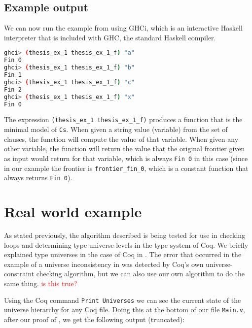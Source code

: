 \subsection{Example output}
\label{sssec:example_output}

We can now run the example from  using GHCi,
which is an interactive Haskell interpreter that is included with GHC, the standard Haskell compiler.

\begin{minipage}{\linewidth}
\begin{lstlisting}[language=bash, label={lst:thm_32_haskell_output}, caption={\lstinline{thm_32} example output}]
ghci> (thesis_ex_1 thesis_ex_1_f) "a"
Fin 0
ghci> (thesis_ex_1 thesis_ex_1_f) "b"
Fin 1
ghci> (thesis_ex_1 thesis_ex_1_f) "c"
Fin 2
ghci> (thesis_ex_1 thesis_ex_1_f) "x"
Fin 0
\end{lstlisting}
\end{minipage}

The expression \lstinline[language=Haskell]{(thesis_ex_1 thesis_ex_1_f)} produces a function that is the minimal model of \lstinline{Cs}.
When given a string value (variable) from the set of clauses, the function will compute the value of that variable.
When given any other variable, the function will return the value that the original frontier given as input
would return for that variable, which is always \lstinline{Fin 0} in this case
(since in our example the frontier is \lstinline{frontier_fin_0},
which is a constant function that always returns \lstinline{Fin 0}).

\section{Real world example}
\label{sec:real_world_example}

As stated previously, the algorithm described  is being
tested for use in checking loops and determining type universe levels in the
type system of Coq.
We briefly explained type universes in the case of Coq in .
The error that occurred in the example of a universe inconsistency in 
was detected by Coq's own universe-constraint checking algorithm, but we can also use our own algorithm to do the same thing.
\textcolor{red}{is this true?}

Using the Coq command \lstinline{Print Universes} we can see the current state of the universe hierarchy for any Coq file.
Doing this at the bottom of our file \lstinline{Main.v}, after our proof of ,
we get the following output (truncated):

